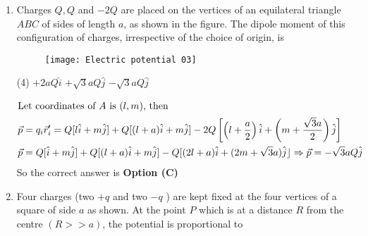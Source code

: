 \begin{enumerate}
	{}
	\begin{tasks}(4)
		\task[\textbf{A.}] $r e^{-K r}$
		\task[\textbf{B.}] $\frac{1}{r} e^{-K r}$
		\task[\textbf{C.}] $\frac{1}{r^{2}} e^{-K r}$
		\task[\textbf{D.}] $\frac{1}{r}\left(1-e^{-K r}\right)$
	\end{tasks}
	\begin{answer}
		\begin{align*}
		\text{	since }\nabla^{2} V&=-\rho / \varepsilon_{0}\\
		\nabla^{2} V\text{ must be proportional to }\frac{A}{r} e^{-k r},\text{ where }\nabla^{2} V&=\frac{1}{r^{2}} \frac{\partial}{\partial r}\left(r^{2} \frac{\partial V}{\partial r}\right).
		\end{align*}
		So the correct answer is \textbf{Option (B)}
	\end{answer}
	\item Charges $Q, Q$ and $-2 Q$ are placed on the vertices of an equilateral triangle $A B C$ of sides of length $a$, as shown in the figure. The dipole moment of this configuration of charges, irrespective of the choice of origin, is
	{}
	\begin{figure}[H]
		\centering
		\texttt{[image: Electric potential 03]}
		\caption{}
		\label{}
	\end{figure}
	\begin{tasks}(4)
		\task[\textbf{A.}] $+2 a Q \hat{i}$
		\task[\textbf{B.}] $+\sqrt{3} a Q \hat{j}$
		\task[\textbf{C.}] $-\sqrt{3} a Q \hat{j}$
	\end{tasks}
	\begin{answer}
		\begin{align*}
		\intertext{Let coordinates of $A$ is $(l, m)$, then}
		\vec{p}&=q_{i} \vec{r}_{i}^{\prime}=Q[l \hat{i}+m \hat{j}]+Q[(l+a) \hat{i}+m \hat{j}]-2 Q\left[\left(l+\frac{a}{2}\right) \hat{i}+\left(m+\frac{\sqrt{3} a}{2}\right) \hat{j}\right]\\
		\vec{p}&=Q[\hat{i}+m \hat{j}]+Q[(l+a) \hat{i}+m \hat{j}]-Q[(2 l+a) \hat{i}+(2 m+\sqrt{3} a) \hat{j}\rfloor \Rightarrow \vec{p}=-\sqrt{3} a Q \hat{j}
		\end{align*}
		So the correct answer is \textbf{Option (C)}
	\end{answer}
	\item  Four charges (two $+q$ and two $-q$ ) are kept fixed at the four vertices of a square of side $a$ as shown. At the point $P$ which is at a distance $R$ from the centre $(R>>a)$, the potential is proportional to

\end{enumerate}
